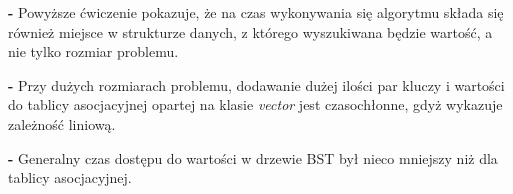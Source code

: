 \documentclass[12pt,a4paper,titlepage]{article}
\begin{document}
\begin{flushleft}
\textbf{-}  Powyższe ćwiczenie pokazuje, że na czas wykonywania się algorytmu składa się również miejsce w strukturze danych, z którego wyszukiwana będzie wartość, a nie tylko rozmiar problemu.\newline

 
 
\textbf{-}  Przy dużych rozmiarach problemu, dodawanie dużej ilości par kluczy i wartości do tablicy asocjacyjnej opartej na klasie \textit{vector} jest czasochłonne, gdyż wykazuje zależność liniową.\newline
 
\textbf{-} Generalny czas dostępu do wartości w drzewie BST był nieco mniejszy niż dla tablicy asocjacyjnej.\newline
 \end{flushleft} 
\end{document}

